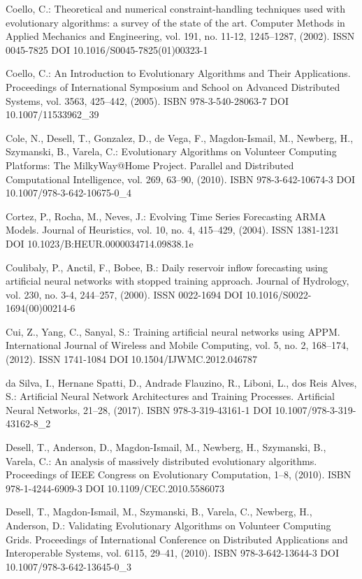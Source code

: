 \begin{thebibliography}{99.}
 Coello, C.: Theoretical and numerical constraint-handling techniques used with evolutionary algorithms: a survey of the state of the art. Computer Methods in Applied Mechanics and Engineering, vol. 191, no. 11-12, 1245--1287, (2002). ISSN 0045-7825 DOI 10.1016/S0045-7825(01)00323-1

 Coello, C.: An Introduction to Evolutionary Algorithms and Their Applications. Proceedings of International Symposium and School on Advanced Distributed Systems, vol. 3563, 425--442, (2005). ISBN 978-3-540-28063-7 DOI 10.1007/11533962\_39

 Cole, N., Desell, T., Gonzalez, D., de Vega, F., Magdon-Ismail, M., Newberg, H., Szymanski, B., Varela, C.:  Evolutionary Algorithms on Volunteer Computing Platforms: The MilkyWay@Home Project. Parallel and Distributed Computational Intelligence, vol. 269, 63--90, (2010). ISBN 978-3-642-10674-3 DOI 10.1007/978-3-642-10675-0\_4

 Cortez, P., Rocha, M., Neves, J.: Evolving Time Series Forecasting ARMA Models. Journal of Heuristics, vol. 10, no. 4, 415--429, (2004). ISSN 1381-1231 DOI 10.1023/B:HEUR.0000034714.09838.1e

 Coulibaly, P., Anctil, F., Bobee, B.: Daily reservoir inflow forecasting using artificial neural networks with stopped training approach. Journal of Hydrology, vol. 230, no. 3-4, 244--257, (2000). ISSN 0022-1694 DOI 10.1016/S0022-1694(00)00214-6

 Cui, Z., Yang, C., Sanyal, S.: Training artificial neural networks using APPM. International Journal of Wireless and Mobile Computing, vol. 5, no. 2, 168--174, (2012). ISSN 1741-1084 DOI 10.1504/IJWMC.2012.046787

 da Silva, I., Hernane Spatti, D., Andrade Flauzino, R., Liboni, L., dos Reis Alves, S.: Artificial Neural Network Architectures and Training Processes. Artificial Neural Networks, 21--28, (2017). ISBN 978-3-319-43161-1 DOI 10.1007/978-3-319-43162-8\_2

 Desell, T., Anderson, D., Magdon-Ismail, M., Newberg, H., Szymanski, B., Varela, C.: An analysis of massively distributed evolutionary algorithms. Proceedings of IEEE Congress on Evolutionary Computation, 1--8, (2010). ISBN 978-1-4244-6909-3 DOI 10.1109/CEC.2010.5586073

 Desell, T., Magdon-Ismail, M., Szymanski, B., Varela, C., Newberg, H., Anderson, D.: Validating Evolutionary Algorithms on Volunteer Computing Grids. Proceedings of International Conference on Distributed Applications and Interoperable Systems, vol. 6115, 29--41, (2010). ISBN 978-3-642-13644-3 DOI 10.1007/978-3-642-13645-0\_3


\end{thebibliography}
